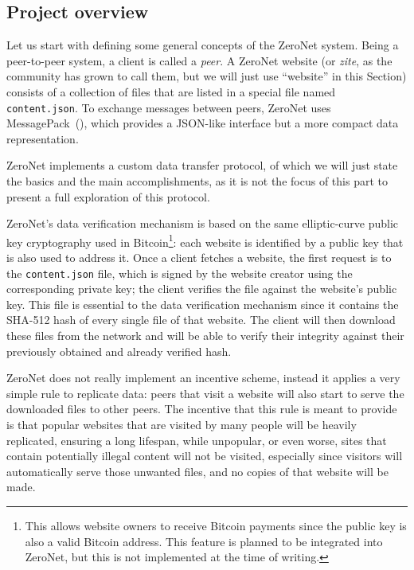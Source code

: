 \documentclass[mscthesis]{usiinfthesis}
\begin{document}
\subsection{Project overview}

Let us start with defining some general concepts of the ZeroNet system. Being a peer-to-peer system, a client is called a \emph{peer}. A ZeroNet website (or \emph{zite}, as the community has grown to call them, but we will just use ``website'' in this Section) consists of a collection of files that are listed in a special file named \texttt{content.json}. To exchange messages between peers, ZeroNet uses MessagePack~(\cite{website:msgpack}), which provides a JSON-like interface but a more compact data representation.

ZeroNet implements a custom data transfer protocol, of which we will just state the basics and the main accomplishments, as it is not the focus of this part to present a full exploration of this protocol.

ZeroNet's data verification mechanism is based on the same elliptic-curve public key cryptography used in Bitcoin\footnote{This allows website owners to receive Bitcoin payments since the public key is also a valid Bitcoin address. This feature is planned to be integrated into ZeroNet, but this is not implemented at the time of writing.}: each website is identified by a public key that is also used to address it. Once a client fetches a website, the first request is to the \texttt{content.json} file, which is signed by the website creator using the corresponding private key; the client verifies the file against the website's public key. This file is essential to the data verification mechanism since it contains the SHA-512 hash of every single file of that website. The client will then download these files from the network and will be able to verify their integrity against their previously obtained and already verified hash.

ZeroNet does not really implement an incentive scheme, instead it applies a very simple rule to replicate data: peers that visit a website will also start to serve the downloaded files to other peers. The incentive that this rule is meant to provide is that popular websites that are visited by many people will be heavily replicated, ensuring a long lifespan, while unpopular, or even worse, sites that contain potentially illegal content will not be visited, especially since visitors will automatically serve those unwanted files, and no copies of that website will be made.
\end{document}
